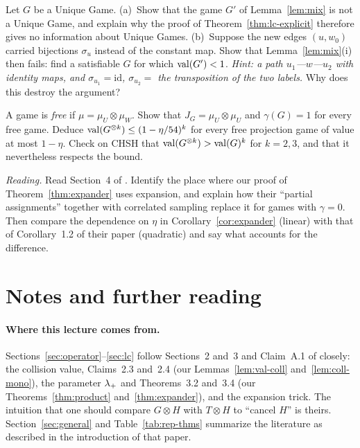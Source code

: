 \begin{exercise}[\stars{$\star$}]\label{ex:ug-mix}
Let $G$ be a Unique Game.  (a)~Show that the game $G'$ of Lemma~\ref{lem:mix} is not a Unique Game, and explain why the proof of Theorem~\ref{thm:lc-explicit} therefore gives no information about Unique Games.
(b)~Suppose the new edges $(u,w_0)$ carried bijections $\sigma_u$ instead of the constant map.  Show that Lemma~\ref{lem:mix}(i) then fails: find a satisfiable $G$ for which $\operatorname{val}(G')<1$.  \emph{Hint: a path $u_1$---$w$---$u_2$ with identity maps, and $\sigma_{u_1}=\mathrm{id}$, $\sigma_{u_2}=$ the transposition of the two labels.}  Why does this destroy the argument?
\end{exercise}

\begin{exercise}[\stars{$\star\star$}]\label{ex:free}
A game is \emph{free} if $\mu=\mu_U\otimes\mu_W$.  Show that $J_G=\mu_U\otimes\mu_U$ and $\gamma(G)=1$ for every free game.  Deduce $\operatorname{val}(G^{\otimes k})\le(1-\eta/54)^k$ for every free projection game of value at most $1-\eta$.  Check on CHSH that $\operatorname{val}(G^{\otimes k})>\operatorname{val}(G)^k$ for $k=2,3$, and that it nevertheless respects the bound.
\end{exercise}

\begin{exercise}[\stars{$\star\star\star$}]\label{ex:reading-ds}
\emph{Reading.}  Read Section~4 of \citet{DinurSteurer14}.  Identify the place where our proof of Theorem~\ref{thm:expander} uses expansion, and explain how their ``partial assignments'' together with correlated sampling replace it for games with $\gamma=0$.
Then compare the dependence on $\eta$ in Corollary~\ref{cor:expander} (linear) with that of Corollary~1.2 of their paper (quadratic) and say what accounts for the difference.
\end{exercise}


\section*{Notes and further reading}

\paragraph{Where this lecture comes from.}
Sections~\ref{sec:operator}--\ref{sec:lc} follow Sections~2 and~3 and Claim~A.1 of \citet{DinurSteurer14} closely: the collision value, Claims~2.3 and~2.4 (our Lemmas~\ref{lem:val-coll} and~\ref{lem:coll-mono}), the parameter $\lambda_{+}$ and Theorems~3.2 and~3.4 (our Theorems~\ref{thm:product} and~\ref{thm:expander}), and the expansion trick.
The intuition that one should compare $G\otimes H$ with $T\otimes H$ to ``cancel $H$'' is theirs.  Section~\ref{sec:general} and Table~\ref{tab:rep-thms} summarize the literature as described in the introduction of that paper.

